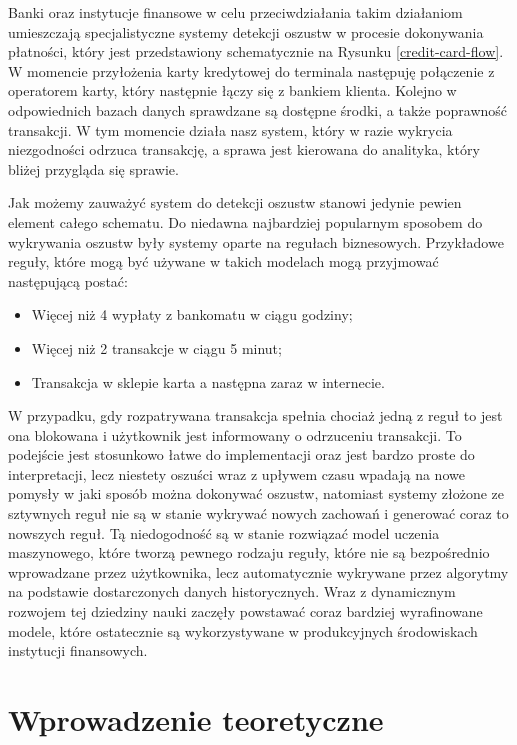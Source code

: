 \documentclass{book}
\begin{document}
	Banki oraz instytucje finansowe w celu przeciwdziałania takim działaniom umieszczają specjalistyczne systemy detekcji oszustw w procesie dokonywania płatności, który jest przedstawiony schematycznie na Rysunku \ref{credit-card-flow}. W momencie przyłożenia karty kredytowej do terminala następuję połączenie z operatorem karty, który następnie łączy się z bankiem klienta. Kolejno w odpowiednich bazach danych sprawdzane są dostępne środki, a także poprawność transakcji. W tym momencie działa nasz system, który w razie wykrycia niezgodności odrzuca transakcję, a sprawa jest kierowana do analityka, który bliżej przygląda się sprawie.

	Jak możemy zauważyć system do detekcji oszustw stanowi jedynie pewien element całego schematu. Do niedawna najbardziej popularnym sposobem do wykrywania oszustw były systemy oparte na regułach biznesowych. Przykładowe reguły, które mogą być używane w takich modelach mogą przyjmować następującą postać:
	\begin{itemize}
		\item Więcej niż 4 wypłaty z bankomatu w ciągu godziny;
		\item Więcej niż 2 transakcje w ciągu 5 minut;
		\item Transakcja w sklepie karta a następna zaraz w internecie.
	\end{itemize}
	W przypadku, gdy rozpatrywana transakcja spełnia chociaż jedną z reguł to jest ona blokowana i użytkownik jest informowany o odrzuceniu transakcji. To podejście jest stosunkowo łatwe do implementacji oraz jest bardzo proste do interpretacji, lecz niestety oszuści wraz z upływem czasu wpadają na nowe pomysły w jaki sposób można dokonywać oszustw, natomiast systemy złożone ze sztywnych reguł nie są w stanie wykrywać nowych zachowań i generować coraz to nowszych reguł. Tą niedogodność są w stanie rozwiązać model uczenia maszynowego, które tworzą pewnego rodzaju reguły, które nie są bezpośrednio wprowadzane przez użytkownika, lecz automatycznie wykrywane przez algorytmy na podstawie dostarczonych danych historycznych. Wraz z dynamicznym rozwojem tej dziedziny nauki zaczęły powstawać coraz bardziej wyrafinowane modele, które ostatecznie są wykorzystywane w produkcyjnych środowiskach instytucji finansowych. 

\chapter{Wprowadzenie teoretyczne}
\end{document}

